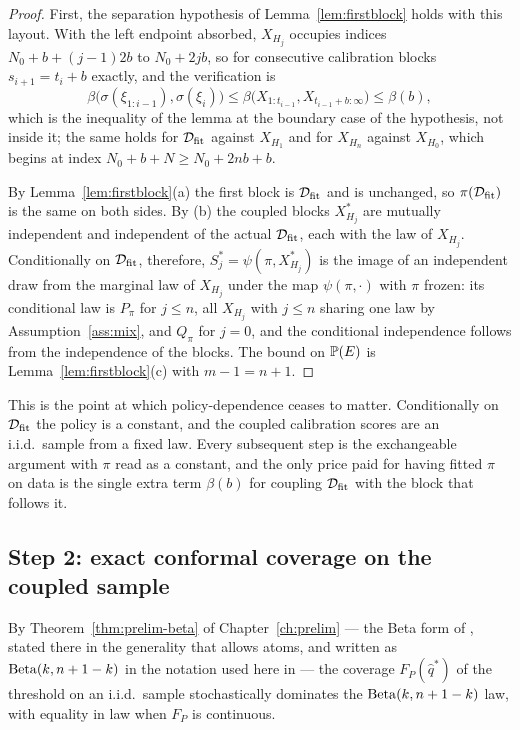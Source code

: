 \documentclass[../../../main.tex]{subfiles}
\begin{document}
\begin{proof}
First, the separation hypothesis of Lemma~\ref{lem:firstblock} holds with this layout. With the left endpoint absorbed, $X_{H_j}$ occupies indices $N_0+b+(j-1)2b$ to $N_0+2jb$, so for consecutive calibration blocks $s_{i+1}=t_i+b$ exactly, and the verification is
\[
\beta\big(\sigma(\xi_{1:i-1}),\sigma(\xi_i)\big)\le\beta\big(X_{1:t_{i-1}},X_{t_{i-1}+b:\infty}\big)\le\beta(b),
\]
which is the inequality of the lemma at the boundary case of the hypothesis, not inside it; the same holds for $\mathcal D_{\mathrm{fit}}$ against $X_{H_1}$ and for $X_{H_n}$ against $X_{H_0}$, which begins at index $N_0+b+N\ge N_0+2nb+b$.

By Lemma~\ref{lem:firstblock}(a) the first block is $\mathcal D_{\mathrm{fit}}$ and is unchanged, so $\pi(\mathcal D_{\mathrm{fit}})$ is the same on both sides. By (b) the coupled blocks $X^*_{H_j}$ are mutually independent and independent of the actual $\mathcal D_{\mathrm{fit}}$, each with the law of $X_{H_j}$. Conditionally on $\mathcal D_{\mathrm{fit}}$, therefore, $S^*_j=\psi(\pi,X^*_{H_j})$ is the image of an independent draw from the marginal law of $X_{H_j}$ under the map $\psi(\pi,\cdot)$ with $\pi$ frozen: its conditional law is $P_\pi$ for $j\le n$, all $X_{H_j}$ with $j\le n$ sharing one law by Assumption~\ref{ass:mix}, and $Q_\pi$ for $j=0$, and the conditional independence follows from the independence of the blocks. The bound on $\mathbb{P}(E)$ is Lemma~\ref{lem:firstblock}(c) with $m-1=n+1$.
\end{proof}

This is the point at which policy-dependence ceases to matter. Conditionally on $\mathcal D_{\mathrm{fit}}$ the policy is a constant, and the coupled calibration scores are an i.i.d.\ sample from a fixed law. Every subsequent step is the exchangeable argument with $\pi$ read as a constant, and the only price paid for having fitted $\pi$ on data is the single extra term $\beta(b)$ for coupling $\mathcal D_{\mathrm{fit}}$ with the block that follows it.

\subsection{Step 2: exact conformal coverage on the coupled sample}\label{sec:step2}

By Theorem~\ref{thm:prelim-beta} of Chapter~\ref{ch:prelim} --- the Beta form of \citep[Prop.~2b, p.~479]{vovk2012}, stated there in the generality that allows atoms, and written as $\operatorname{Beta}(k,n+1-k)$ in the notation used here in \citep[eq.~(4), p.~2]{zwart2025} --- the coverage $F_P(\hat q^*)$ of the threshold on an i.i.d.\ sample stochastically dominates the $\operatorname{Beta}(k,n+1-k)$ law, with equality in law when $F_P$ is continuous.
\end{document}
